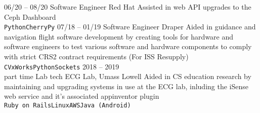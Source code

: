 \documentclass[9pt]{developercv} %
\begin{document}
\vspace{0.5cm}





\begin{entrylist}
	\entry
		{06/20 -- 08/20}
		{Software Engineer}
		{Red Hat}
		{Assisted in web API upgrades to the Ceph Dashboard\\
        \texttt{Python}\slashsep\texttt{CherryPy}}
	\entry
		{07/18 -- 01/19}
		{Software Engineer}
		{Draper}
		{Aided in guidance and navigation flight software development by creating
        tools for hardware and software engineers to test various software and
        hardware components to comply with strict CRS2 contract requirements (For ISS Resupply)\\
        \texttt{C}\slashsep\texttt{VxWorks}\slashsep\texttt{Python}\slashsep\texttt{Sockets}}
	\entry
		{2018 -- 2019\\\footnotesize{part time}}
		{Lab tech}
        {ECG Lab, Umass Lowell}
		{Aided in CS education research by maintaining and upgrading systems in use at the ECG lab,
        inluding the iSense web service and it's associated appinventor plugin\\
        \texttt{Ruby on Rails}\slashsep\texttt{Linux}\slashsep\texttt{AWS}\slashsep\texttt{Java (Android)}}
\end{entrylist}
\end{document}
